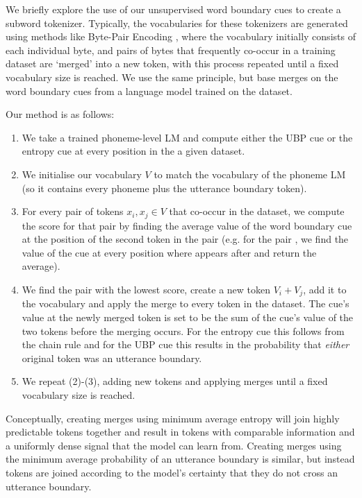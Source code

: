 We briefly explore the use of our unsupervised word boundary cues to create a subword tokenizer. Typically, the vocabularies for these tokenizers are generated using methods like Byte-Pair Encoding \citep{sennrich-etal-2016-bpe}, where the vocabulary initially consists of each individual byte, and pairs of bytes that frequently co-occur in a training dataset are `merged' into a new token, with this process repeated until a fixed vocabulary size is reached. We use the same principle, but base merges on the word boundary cues from a language model trained on the dataset.

Our method is as follows:

\begin{enumerate}
    \item We take a trained phoneme-level LM and compute either the UBP cue or the entropy cue at every position in the a given dataset. 
    \item We initialise our vocabulary $V$ to match the vocabulary of the phoneme LM (so it contains every phoneme plus the utterance boundary token).
    \item For every pair of tokens $x_i, x_j \in V$ that co-occur in the dataset, we compute the score for that pair by finding the average value of the word boundary cue at the position of the second token in the pair (e.g. for the pair , we find the value of the cue at every position where  appears after  and return the average). 
    \item We find the pair with the lowest score, create a new token $V_i+V_j$, add it to the vocabulary and apply the merge to every token in the dataset. The cue's value at the newly merged token is set to be the sum of the cue's value of the two tokens before the merging occurs. For the entropy cue this follows from the chain rule and for the UBP cue this results in the probability that \emph{either} original token was an utterance boundary.
    \item We repeat (2)-(3), adding new tokens and applying merges until a fixed vocabulary size is reached.
\end{enumerate}

Conceptually, creating merges using minimum average entropy will join highly predictable tokens together and result in tokens with comparable information and a uniformly dense signal that the model can learn from. Creating merges using the minimum average probability of an utterance boundary is similar, but instead tokens are joined according to the model's certainty that they do not cross an utterance boundary. 


